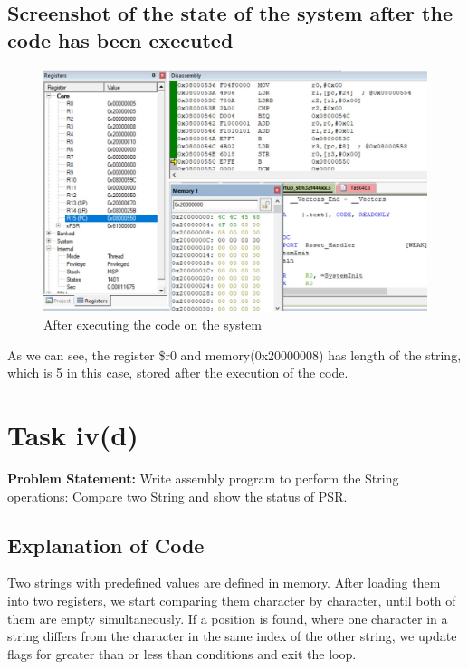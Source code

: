 \documentclass[footheight=20pt, footsepline, headheight=20pt, headsepline]{scrartcl}
\begin{document}
\subsection*{Screenshot of the state of the system after the code has been executed}
\begin{figure}[h!]
    \centering
    \includegraphics[scale=.7]{images/Task4c_After1.jpg}
    \caption{After executing the code on the system}
    \label{fig:after_task_4c}
\end{figure}
\FloatBarrier
As we can see, the register \$r0 and memory(0x20000008) has length of the string, which is 5 in this case, stored after the execution of the code.






\FloatBarrier
{}
\section*{Task iv(d)}
\textbf{Problem Statement:} Write assembly program to perform the String operations: Compare two String and show the status of PSR.
\subsection*{Explanation of Code}
Two strings with predefined values are defined in memory. After loading them into two registers, we start comparing them character by character, until both of them are empty simultaneously. If a position is found, where one character in a string differs from the character in the same index of the other string, we update flags for greater than or less than conditions and exit the loop.
\end{document}
